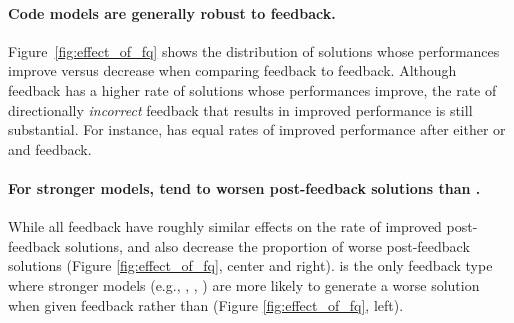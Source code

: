 \paragraph{Code models are generally robust to \lqf{} feedback.}
Figure~\ref{fig:effect_of_fq} shows the distribution of solutions whose performances improve versus decrease when comparing \hqf{} feedback to \lqf{} feedback. 
Although \hqf{} feedback has a higher rate of solutions whose performances improve, the rate of directionally \textit{incorrect} feedback that results in improved performance is still substantial.
For instance, \sonnet{} has equal rates of improved performance after either \hqf{} or \lqf{} \para{} and \sent{} feedback.

\paragraph{For stronger models, \hqf{} \cf{} tend to worsen post-feedback solutions than \lqf{} \cf.} While all \hqf{} feedback have roughly similar effects on the rate of improved post-feedback solutions, \para{} and \sent{} also decrease the proportion of worse post-feedback solutions (Figure \ref{fig:effect_of_fq}, center and right).
\cf{} is the only feedback type where stronger models (e.g., \sonnet, \gpt, \qwenLarge) are more likely to generate a worse solution when given \hqf{} feedback rather than \lqf{} (Figure \ref{fig:effect_of_fq}, left).



